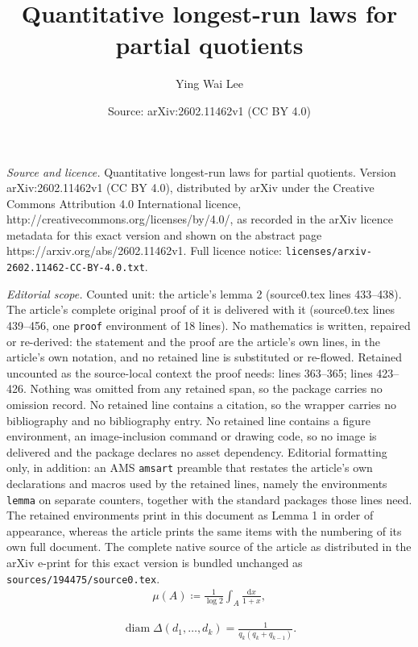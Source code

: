 \documentclass[10pt,a4paper]{amsart}
\title{Quantitative longest-run laws for partial quotients}
\author{Ying Wai Lee}
\date{Source: arXiv:2602.11462v1 (CC BY 4.0)}
\begin{document}
\maketitle

\noindent\emph{Source and licence.} Quantitative longest-run laws for partial quotients. Version arXiv:2602.11462v1 (CC BY 4.0), distributed by arXiv under the Creative Commons Attribution 4.0 International licence, http://creativecommons.org/licenses/by/4.0/, as recorded in the arXiv licence metadata for this exact version and shown on the abstract page https://arxiv.org/abs/2602.11462v1. Full licence notice: \texttt{licenses/arxiv-2602.11462-CC-BY-4.0.txt}.\par\smallskip

\noindent\textit{Editorial scope.} Counted unit: the article's lemma 2 (source0.tex lines 433--438). The article's complete original proof of it is delivered with it (source0.tex lines 439--456, one \texttt{proof} environment of 18 lines). No mathematics is written, repaired or re-derived: the statement and the proof are the article's own lines, in the article's own notation, and no retained line is substituted or re-flowed.  Retained uncounted as the source-local context the proof needs: lines 363--365; lines 423--426.  Nothing was omitted from any retained span, so the package carries no omission record.  No retained line contains a citation, so the wrapper carries no bibliography and no bibliography entry.  No retained line contains a figure environment, an image-inclusion command or drawing code, so no image is delivered and the package declares no asset dependency.  Editorial formatting only, in addition: an AMS \texttt{amsart} preamble that restates the article's own declarations and macros used by the retained lines, namely the environments \texttt{lemma} on separate counters, together with the standard packages those lines need.  The retained environments print in this document as Lemma 1 in order of appearance, whereas the article prints the same items with the numbering of its own full document.  The complete native source of the article as distributed in the arXiv e-print for this exact version is bundled unchanged as \texttt{sources/194475/source0.tex}.
\begin{align}\label{eq: 16}
    \mu{(A)}\coloneqq\frac{1}{\log 2}\int_A\frac{\mathrm{d}x}{1+x},
\end{align}

\begin{align}\label{eq: 17}
    \operatorname{diam}{\Delta{(d_1,\dots,d_k)}}
    =\frac{1}{q_k(q_k+q_{k-1})}.
\end{align}
\end{document}
